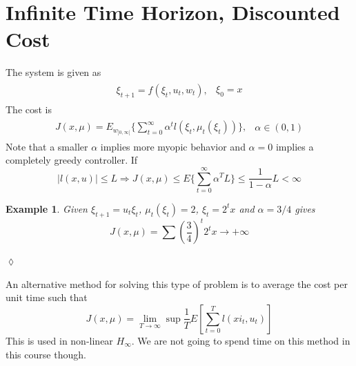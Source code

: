 \documentclass[lecture,12pt,]{pcms-l}
\theoremstyle{example}
\newtheorem{example}{Example}[section]
\begin{document}
\section{Infinite Time Horizon, Discounted Cost}
The system is given as
\begin{align*}
\begin{split}
\xi_{t+1} = f(\xi_t,u_t,w_t),
\end{split}
\begin{split}
\xi_0 = x
\end{split}
\end{align*}
The cost is
\begin{align*}
\begin{split}
J(x,\mu) = E_{w_{]0,\infty[}}\{\sum_{t=0}^\infty \alpha^tl(\xi_t,\mu_t(\xi_t))\},
\end{split}
\begin{split}
\alpha\in(0,1)
\end{split}
\end{align*}
Note that a smaller $\alpha$ implies more myopic behavior and $\alpha=0$ implies a completely greedy controller. If
$$|l(x,u)|\leq L \Rightarrow J(x,\mu)\leq E\{\sum_{t=0}^\infty \alpha^TL\}\leq \frac{1}{1-\alpha}L<\infty$$

\begin{example}
Given $\xi_{t+1}=u_t\xi_t$, $\mu_t(\xi_t)=2$, $\xi_t=2^tx$ and $\alpha=3/4$ gives
$$J(x,\mu) = \sum(\frac{3}{4})^t2^tx\to+\infty$$
\end{example}
$\lozenge$

An alternative method for solving this type of problem is to average the cost per unit time such that
$$J(x,\mu) = \lim_{T\to\infty}\sup \frac{1}{T}E[\sum_{t=0}^Tl(xi_t,u_t)]$$
This is used in non-linear $H_\infty$. We are not going to spend time on this method in this course though.
\end{document}
